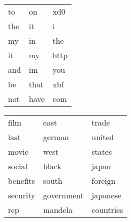 \begin{table}
    \begin{tabular}{lll}
    to  & on   & xd0  \\
    the & it   & i    \\
     my & in   & the  \\
     it & my   & http \\
    and & im   & you  \\
     be & that & xbf  \\
    not & have & com  \\
    \end{tabular}
\end{table}

\begin{table}
    \begin{tabular}{lll}
 film	& east	& trade \\
 last	& german	& united \\
 movie	& west	& states \\
 social	& black	& japan \\
 benefits	& south	& foreign \\
 security	& government	& japanese \\
 rep	& mandela	& countries \\
     \end{tabular}
\end{table}